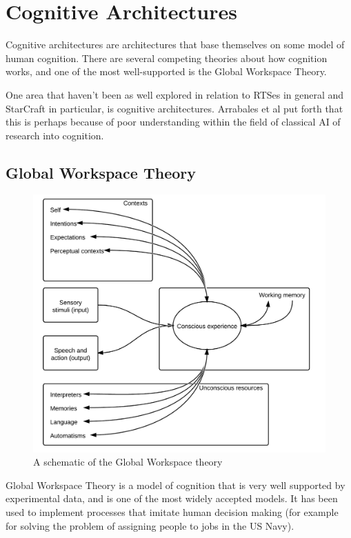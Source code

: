 \section{Cognitive Architectures}
\label{sec:cogarch}
Cognitive architectures are architectures that base themselves on some model of human cognition. There are several competing theories about how cognition works, and one of the most well-supported is the Global Workspace Theory.

One area that haven't been as well explored in relation to RTSes in general and StarCraft in particular, is cognitive architectures. Arrabales et al put forth that this is perhaps because of poor understanding within the field of classical AI of research into cognition\cite{arrabales2009gamechars}.

\subsection{Global Workspace Theory}

\begin{figure}[h!tb]
\centering
\includegraphics[scale=1.0]{graphics/globalworkspace.png}
\caption{A schematic of the Global Workspace theory\cite{baars2005gwt}}
\label{fig:gwt}
\end{figure}

Global Workspace Theory is a model of cognition that is very well supported by experimental data, and is one of the most widely accepted models. \cite{dehaene2001towards} It has been used to implement processes that imitate human decision making (for example for solving the problem of assigning people to jobs in the US Navy).\cite{baars2005gwt}\cite{franklin2003interacting}

